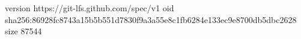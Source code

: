 version https://git-lfs.github.com/spec/v1
oid sha256:86928fc8743a15b5b551d7830f9a3a55e8c1fb6284e133ec9e8700db5dbc2628
size 87544
